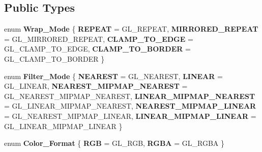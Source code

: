 \subsection*{Public Types}
\begin{DoxyCompactItemize}
\item 
\mbox{\label{classprz_1_1_texture_a667c9ad6d1fd3ea22cf86754189ba7f7}} 
enum {\bfseries Wrap\+\_\+\+Mode} \{ {\bfseries R\+E\+P\+E\+AT} = G\+L\+\_\+\+R\+E\+P\+E\+AT, 
{\bfseries M\+I\+R\+R\+O\+R\+E\+D\+\_\+\+R\+E\+P\+E\+AT} = G\+L\+\_\+\+M\+I\+R\+R\+O\+R\+E\+D\+\_\+\+R\+E\+P\+E\+AT, 
{\bfseries C\+L\+A\+M\+P\+\_\+\+T\+O\+\_\+\+E\+D\+GE} = G\+L\+\_\+\+C\+L\+A\+M\+P\+\_\+\+T\+O\+\_\+\+E\+D\+GE, 
{\bfseries C\+L\+A\+M\+P\+\_\+\+T\+O\+\_\+\+B\+O\+R\+D\+ER} = G\+L\+\_\+\+C\+L\+A\+M\+P\+\_\+\+T\+O\+\_\+\+B\+O\+R\+D\+ER
 \}
\item 
\mbox{\label{classprz_1_1_texture_a1887b18d9f0370660ac87c66520abc1f}} 
enum {\bfseries Filter\+\_\+\+Mode} \{ \newline
{\bfseries N\+E\+A\+R\+E\+ST} = G\+L\+\_\+\+N\+E\+A\+R\+E\+ST, 
{\bfseries L\+I\+N\+E\+AR} = G\+L\+\_\+\+L\+I\+N\+E\+AR, 
{\bfseries N\+E\+A\+R\+E\+S\+T\+\_\+\+M\+I\+P\+M\+A\+P\+\_\+\+N\+E\+A\+R\+E\+ST} = G\+L\+\_\+\+N\+E\+A\+R\+E\+S\+T\+\_\+\+M\+I\+P\+M\+A\+P\+\_\+\+N\+E\+A\+R\+E\+ST, 
{\bfseries L\+I\+N\+E\+A\+R\+\_\+\+M\+I\+P\+M\+A\+P\+\_\+\+N\+E\+A\+R\+E\+ST} = G\+L\+\_\+\+L\+I\+N\+E\+A\+R\+\_\+\+M\+I\+P\+M\+A\+P\+\_\+\+N\+E\+A\+R\+E\+ST, 
\newline
{\bfseries N\+E\+A\+R\+E\+S\+T\+\_\+\+M\+I\+P\+M\+A\+P\+\_\+\+L\+I\+N\+E\+AR} = G\+L\+\_\+\+N\+E\+A\+R\+E\+S\+T\+\_\+\+M\+I\+P\+M\+A\+P\+\_\+\+L\+I\+N\+E\+AR, 
{\bfseries L\+I\+N\+E\+A\+R\+\_\+\+M\+I\+P\+M\+A\+P\+\_\+\+L\+I\+N\+E\+AR} = G\+L\+\_\+\+L\+I\+N\+E\+A\+R\+\_\+\+M\+I\+P\+M\+A\+P\+\_\+\+L\+I\+N\+E\+AR
 \}
\item 
\mbox{\label{classprz_1_1_texture_a4db479fb4bde395e7d411d0848ff8ca6}} 
enum {\bfseries Color\+\_\+\+Format} \{ {\bfseries R\+GB} = G\+L\+\_\+\+R\+GB, 
{\bfseries R\+G\+BA} = G\+L\+\_\+\+R\+G\+BA
 \}
\end{DoxyCompactItemize}
